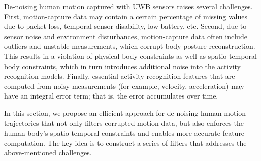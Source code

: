 
De-noising human motion captured with UWB sensors raises several challenges. First, motion-capture data may contain a certain percentage of missing values due to packet loss, temporal sensor disability, low battery, etc. Second, due to sensor noise and environment disturbances, motion-capture data often include outliers and unstable measurements, which corrupt body posture reconstruction. This results in a violation of physical body constraints as well as spatio-temporal body constraints, which in turn introduces additional noise into the activity recognition models. Finally, essential activity recognition features that are computed from noisy measurements (for example, velocity, acceleration) may have an integral error term; that is, the error accumulates over time.

In this section, we propose an efficient approach for de-noising human-motion trajectories that not only filters corrupted motion data, but also enforces the human body's spatio-temporal constraints and enables more accurate feature computation. The key idea is to construct a series of filters that addresses the above-mentioned challenges.


%


